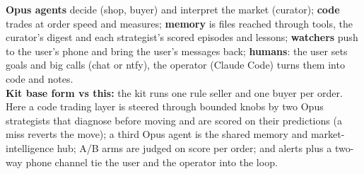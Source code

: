 \documentclass[11pt]{article}
\begin{document}
\vspace{1.5mm}
\parbox{27.6cm}{\sffamily\scriptsize
\textcolor{violet!70!black}{\textbf{Opus agents}} decide (shop, buyer) and interpret the market (curator); \textcolor{blue!60!black}{\textbf{code}} trades at order speed and measures; \textcolor{teal!60!black}{\textbf{memory}} is files reached through tools, the curator's digest and each strategist's scored episodes and lessons; \textcolor{orange!70!black}{\textbf{watchers}} push to the user's phone and bring the user's messages back; \textcolor{red!60!black}{\textbf{humans}}: the user sets goals and big calls (chat or ntfy), the operator (Claude Code) turns them into code and notes.\\
\textbf{Kit base form vs this:} the kit runs one rule seller and one buyer per order. Here a code trading layer is steered through bounded knobs by two Opus strategists that diagnose before moving and are scored on their predictions (a miss reverts the move); a third Opus agent is the shared memory and market-intelligence hub; A/B arms are judged on score per order; and alerts plus a two-way phone channel tie the user and the operator into the loop.}
\end{document}
